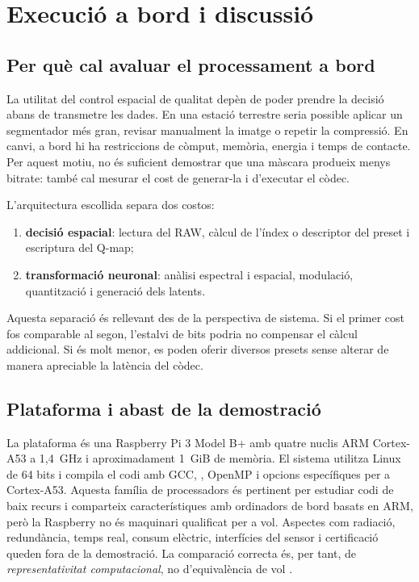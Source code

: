 \chapter{Execució a bord i discussió}\label{ch:bord}
\fancyhead[LO]{\slshape \textsf{\nouppercase \rightmark}}

\section{Per què cal avaluar el processament a bord}\label{sec:onboard_motivation}

La utilitat del control espacial de qualitat depèn de poder prendre la decisió
abans de transmetre les dades. En una estació terrestre seria possible aplicar
un segmentador més gran, revisar manualment la imatge o repetir la compressió.
En canvi, a bord hi ha restriccions de còmput, memòria, energia i temps de
contacte. Per aquest motiu, no és suficient demostrar que una màscara produeix
menys bitrate: també cal mesurar el cost de generar-la i d'executar el còdec.

L'arquitectura escollida separa dos costos:

\begin{enumerate}[leftmargin=*]
  \item \textbf{decisió espacial}: lectura del RAW, càlcul de l'índex o
  descriptor del preset i escriptura del Q-map;
  \item \textbf{transformació neuronal}: anàlisi espectral i espacial,
  modulació, quantització i generació dels latents.
\end{enumerate}

Aquesta separació és rellevant des de la perspectiva de sistema. Si el primer
cost fos comparable al segon, l'estalvi de bits podria no compensar el càlcul
addicional. Si és molt menor, es poden oferir diversos presets sense alterar
de manera apreciable la latència del còdec.

\section{Plataforma i abast de la demostració}\label{sec:rpi_platform}

La plataforma és una Raspberry Pi 3 Model B+ amb quatre nuclis ARM
Cortex-A53 a 1,4~GHz i aproximadament 1~GiB de memòria. El sistema utilitza
Linux de 64 bits i compila el codi amb GCC, , OpenMP i opcions
específiques per a Cortex-A53. Aquesta família de processadors és pertinent per
estudiar codi de baix recurs i comparteix característiques amb ordinadors de
bord basats en ARM, però la Raspberry no és maquinari qualificat per a vol.
Aspectes com radiació, redundància, temps real, consum elèctric, interfícies del
sensor i certificació queden fora de la demostració. La comparació correcta és,
per tant, de \emph{representativitat computacional}, no d'equivalència de vol
\cite{raspberry2018brief,schwaller2017a53,serra2024c3satp}.

